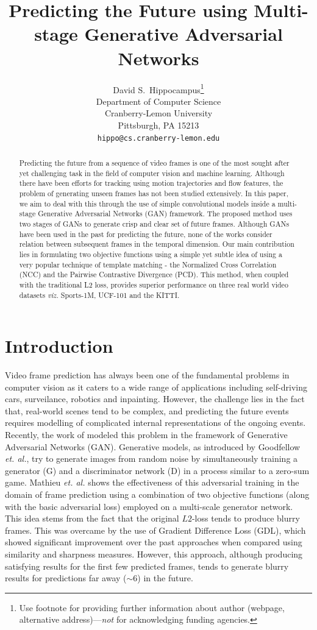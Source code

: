 \documentclass{article}
\title{Predicting the Future using Multi-stage Generative Adversarial Networks}
\author{
  David S.~Hippocampus\thanks{Use footnote for providing further
    information about author (webpage, alternative
    address)---\emph{not} for acknowledging funding agencies.} \\
  Department of Computer Science\\
  Cranberry-Lemon University\\
  Pittsburgh, PA 15213 \\
  \texttt{hippo@cs.cranberry-lemon.edu} \\
}
\begin{document}

\maketitle

\begin{abstract}
  Predicting the future from a sequence of video frames is one of the most sought after yet challenging task in the field of computer vision and machine learning. Although there have been efforts for tracking using motion trajectories and flow features, the problem of generating unseen frames has not been studied extensively. In this paper, we aim to deal with this through the use of simple convolutional models inside a multi-stage Generative Adversarial Networks (GAN) framework.
  The proposed method uses two stages of GANs to generate crisp and clear set of future frames. Although GANs have been used in the past for predicting the future, none of the works consider relation between subsequent frames in the temporal dimension. Our main contribution lies in formulating two objective functions using a simple yet subtle idea of using a very popular technique of template matching - the Normalized Cross Correlation (NCC) and the Pairwise Contrastive Divergence (PCD). This method, when coupled with the traditional L2 loss, provides superior performance on three real world video datasets \textit{viz.} Sports-1M, UCF-101 and the KITTI.
\end{abstract}

\section{Introduction}
  Video frame prediction has always been one of the fundamental problems in computer vision as it caters to a wide range of applications including self-driving cars, surveilance, robotics and inpainting. However, the challenge lies in the fact that, real-world scenes tend to be complex, and predicting the future events requires modelling of complicated internal representations of the ongoing events. Recently, the work of \cite{mathieu2015deep} modeled this problem in the framework of Generative Adversarial Networks (GAN). Generative models, as introduced by Goodfellow \textit{et. al.}, \cite{goodfellow2014generative} try to generate images from random noise by simultaneously training a generator (G) and a discriminator network (D) in a process similar to a zero-sum game. Mathieu \textit{et. al.} \cite{mathieu2015deep} shows the effectiveness of this adversarial training in the domain of frame prediction using a combination of two objective functions (along with the basic adversarial loss) employed on a multi-scale generator network. This idea stems from the fact that the original $ L2 $-loss tends to produce blurry frames. This was overcame by the use of Gradient Difference Loss (GDL), which showed significant improvement over the past approaches when compared using similarity and sharpness measures. However, this approach, although producing satisfying results for the first few predicted frames, tends to generate blurry results for predictions far away ($ \sim $6) in the future. 
  
\end{document}
